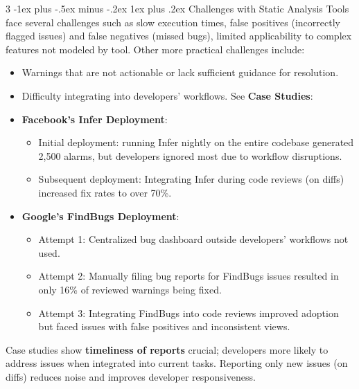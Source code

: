 \documentclass[a4paper, 10pt, landscape]{article}
\makeatletter
\renewcommand{\subsubsection}{\@startsection{subsubsection}{3}{0mm}%
                                {-1ex plus -.5ex minus -.2ex}%
                                {1ex plus .2ex}%
                                {\normalfont\small\bfseries}}
\makeatother
\begin{document}
\begin{multicols*}{3}
\subsubsection{Challenges with Static Analysis}
Tools face several challenges such as slow execution times, false positives (incorrectly flagged issues) and false negatives (missed bugs), limited applicability to complex features not modeled by tool. Other more practical challenges include:
\begin{itemize}
\item Warnings that are not actionable or lack sufficient guidance for resolution.
\item Difficulty integrating into developers' workflows. See \textbf{Case Studies}:
\end{itemize}
\begin{itemize}
\item  \textbf{Facebook's Infer Deployment}:
	\begin{itemize}
	\item Initial deployment: running Infer nightly on the entire codebase generated 2,500 alarms, but developers ignored most due to workflow disruptions.
	\item Subsequent deployment: Integrating Infer during code reviews (on diffs) increased fix rates to over 70\%.
	\end{itemize}
\item \textbf{Google's FindBugs Deployment}:
	\begin{itemize}
	\item Attempt 1: Centralized bug dashboard outside developers' workflows not used.
	\item Attempt 2: Manually filing bug reports for FindBugs issues resulted in only 16\% of reviewed warnings being fixed.
	\item Attempt 3: Integrating FindBugs into code reviews improved adoption but faced issues with false positives and inconsistent views.
	\end{itemize}
\end{itemize}
Case studies show \textbf{timeliness of reports} crucial; developers more likely to address issues when integrated into current tasks. Reporting only new issues (on diffs) reduces noise and improves developer responsiveness.


\end{multicols*}
\end{document}
